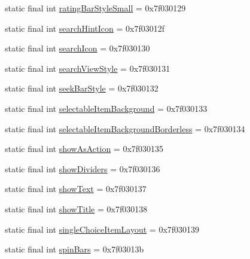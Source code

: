 \begin{DoxyCompactItemize}
\item 
static final int \mbox{\hyperlink{classandroid_1_1support_1_1v7_1_1appcompat_1_1R_1_1attr_aff6925d408e9203959c03b499872814c}{rating\+Bar\+Style\+Small}} = 0x7f030129
\item 
static final int \mbox{\hyperlink{classandroid_1_1support_1_1v7_1_1appcompat_1_1R_1_1attr_a2688f75cc82640a8a704fa001d332fb2}{search\+Hint\+Icon}} = 0x7f03012f
\item 
static final int \mbox{\hyperlink{classandroid_1_1support_1_1v7_1_1appcompat_1_1R_1_1attr_ad99268414f1929044a1f84bf8d51ee0c}{search\+Icon}} = 0x7f030130
\item 
static final int \mbox{\hyperlink{classandroid_1_1support_1_1v7_1_1appcompat_1_1R_1_1attr_ab9b2ec7d0b89ab5a4ffe58337bcfcc12}{search\+View\+Style}} = 0x7f030131
\item 
static final int \mbox{\hyperlink{classandroid_1_1support_1_1v7_1_1appcompat_1_1R_1_1attr_aa8856badbf14c6de3caf2d725dfff02d}{seek\+Bar\+Style}} = 0x7f030132
\item 
static final int \mbox{\hyperlink{classandroid_1_1support_1_1v7_1_1appcompat_1_1R_1_1attr_a18a24684eaf9f44da2f89509089239bc}{selectable\+Item\+Background}} = 0x7f030133
\item 
static final int \mbox{\hyperlink{classandroid_1_1support_1_1v7_1_1appcompat_1_1R_1_1attr_abdee90dc895f59172d94407f95904b04}{selectable\+Item\+Background\+Borderless}} = 0x7f030134
\item 
static final int \mbox{\hyperlink{classandroid_1_1support_1_1v7_1_1appcompat_1_1R_1_1attr_a3c7edd0cae5923177e32940fd0dcd3e0}{show\+As\+Action}} = 0x7f030135
\item 
static final int \mbox{\hyperlink{classandroid_1_1support_1_1v7_1_1appcompat_1_1R_1_1attr_ae948e5364369e00f603e38e8c34e8d14}{show\+Dividers}} = 0x7f030136
\item 
static final int \mbox{\hyperlink{classandroid_1_1support_1_1v7_1_1appcompat_1_1R_1_1attr_a9ac2ca8ed5f729a16074381cc104cc54}{show\+Text}} = 0x7f030137
\item 
static final int \mbox{\hyperlink{classandroid_1_1support_1_1v7_1_1appcompat_1_1R_1_1attr_a21abdb5220f4b4c5dc80beac684f0f63}{show\+Title}} = 0x7f030138
\item 
static final int \mbox{\hyperlink{classandroid_1_1support_1_1v7_1_1appcompat_1_1R_1_1attr_ac19ccf7271deaa0914e545b5c7aa8f74}{single\+Choice\+Item\+Layout}} = 0x7f030139
\item 
static final int \mbox{\hyperlink{classandroid_1_1support_1_1v7_1_1appcompat_1_1R_1_1attr_a63effe2b027bf6d01b674c7dc0cbcce1}{spin\+Bars}} = 0x7f03013b

\end{DoxyCompactItemize}
